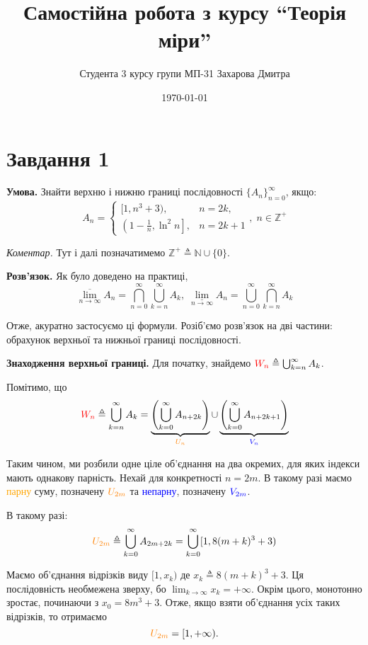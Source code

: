 \documentclass[12pt]{extarticle}
\title{Самостійна робота з курсу ``Теорія міри''}
\author{Студента 3 курсу групи МП-31 Захарова Дмитра}
\date{\today}
\begin{document}
\maketitle

\section*{Завдання 1}

\textbf{Умова.} Знайти верхню і нижню границі послідовності $\{A_n\}_{n=0}^{\infty}$, якщо:
\[
A_n = \begin{cases}
    [1,n^3+3), & n = 2k, \\
    \left(1 - \frac{1}{n},\ln^2 n\right], & n = 2k+1
\end{cases}, \; n \in \mathbb{Z}^+
\]

\textit{Коментар.} Тут і далі позначатимемо $\mathbb{Z}^+ \triangleq \mathbb{N} \cup \{0\}$.

\textbf{Розв'язок.} Як було доведено на практиці,
\[
\underset{n \to \infty}{\overline{\lim}} A_n = \bigcap_{n=0}^{\infty}\bigcup_{k=n}^{\infty}A_k, \; \underset{n \to \infty}{\underline{\lim}}A_n = \bigcup_{n=0}^{\infty}\bigcap_{k=n}^{\infty}A_k
\]

Отже, акуратно застосуємо ці формули. Розіб'ємо розв'язок на дві частини: обрахунок верхньої та нижньої границі послідовності.

\textbf{Знаходження верхньої границі.} Для початку, знайдемо $\textcolor{red}{W_n} \triangleq \bigcup_{k=n}^{\infty}A_k$. 

Помітимо, що
\[
\textcolor{red}{W_n} \triangleq \bigcup_{k=n}^{\infty}A_k = \underbrace{\left(\bigcup_{k=0}^{\infty}A_{n+2k}\right)}_{\textcolor{orange}{U_n}} \cup \underbrace{\left(\bigcup_{k=0}^{\infty}A_{n+2k+1}\right)}_{\textcolor{blue}{V_n}}
\]

Таким чином, ми розбили одне ціле об'єднання на два окремих, для яких індекси мають однакову парність. Нехай для конкретності $n=2m$. В такому разі маємо \textcolor{orange}{парну} суму, позначену $\textcolor{orange}{U_{2m}}$ та \textcolor{blue}{непарну}, позначену $\textcolor{blue}{V_{2m}}$.

В такому разі:
\[
\textcolor{orange}{U_{2m}} \triangleq \bigcup_{k=0}^{\infty}A_{2m+2k} = \bigcup_{k=0}^{\infty} [1,8(m+k)^3+3)
\]

Маємо об'єднання відрізків виду $[1, x_k)$ де $x_k \triangleq 8(m+k)^3+3$. Ця послідовність необмежена зверху, бо $\lim_{k \to \infty}x_k = +\infty$. Окрім цього, монотонно зростає, починаючи з $x_0 = 8m^3+3$. Отже, якщо взяти об'єднання усіх таких відрізків, то отримаємо 
\[
\textcolor{orange}{U_{2m}} = [1, +\infty).
\]
\end{document}
